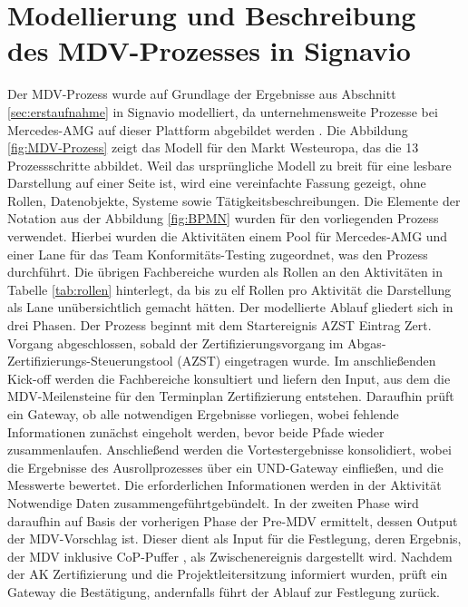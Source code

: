 \section{Modellierung und Beschreibung des MDV-Prozesses in Signavio}
\label{sec:modellierung}
Der MDV-Prozess wurde auf Grundlage der Ergebnisse aus Abschnitt \ref{sec:erstaufnahme} in Signavio modelliert, da unternehmensweite Prozesse bei Mercedes-AMG auf dieser Plattform abgebildet werden . Die Abbildung \ref{fig:MDV-Prozess} zeigt das Modell für den Markt Westeuropa, das die 13 Prozessschritte abbildet. Weil das ursprüngliche Modell zu breit für eine lesbare Darstellung auf einer Seite ist, wird eine vereinfachte Fassung gezeigt, ohne Rollen, Datenobjekte, Systeme sowie Tätigkeitsbeschreibungen. Die Elemente der Notation aus der Abbildung \ref{fig:BPMN} wurden für den vorliegenden Prozess verwendet. Hierbei wurden die Aktivitäten einem Pool für Mercedes-AMG und einer Lane für das Team Konformitäts-Testing zugeordnet, was den Prozess durchführt. Die übrigen Fachbereiche wurden als Rollen an den Aktivitäten in Tabelle \ref{tab:rollen} hinterlegt, da bis zu elf Rollen pro Aktivität die Darstellung als Lane unübersichtlich gemacht hätten.
\newline
Der modellierte Ablauf gliedert sich in drei Phasen. Der Prozess beginnt mit dem Startereignis \glqq AZST Eintrag Zert. Vorgang abgeschlossen\grqq, sobald der Zertifizierungsvorgang im Abgas-Zertifizierungs-Steuerungstool (\acs{AZST}) eingetragen wurde. Im anschließenden Kick-off werden die Fachbereiche konsultiert und liefern den Input, aus dem die MDV-Meilensteine für den Terminplan Zertifizierung entstehen. Daraufhin prüft ein Gateway, ob alle notwendigen Ergebnisse vorliegen, wobei fehlende Informationen zunächst eingeholt werden, bevor beide Pfade wieder zusammenlaufen. Anschließend werden die Vortestergebnisse konsolidiert, wobei die Ergebnisse des Ausrollprozesses über ein UND-Gateway einfließen, und die Messwerte bewertet. Die erforderlichen Informationen werden in der Aktivität \glqq Notwendige Daten zusammengeführt\grqq gebündelt.
\newline
In der zweiten Phase wird daraufhin auf Basis der vorherigen Phase der Pre-MDV ermittelt, dessen Output der MDV-Vorschlag ist. Dieser dient als Input für die Festlegung, deren Ergebnis, der \glqq MDV inklusive \acs{CoP}-Puffer \grqq , als Zwischenereignis dargestellt wird. Nachdem der AK Zertifizierung und die Projektleitersitzung informiert wurden, prüft ein Gateway die Bestätigung, andernfalls führt der Ablauf zur Festlegung zurück.
